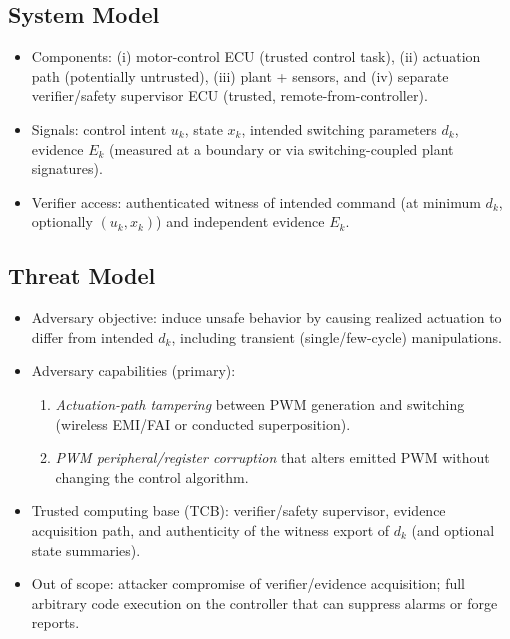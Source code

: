 \subsection{System Model}
\begin{itemize}
    \item Components: (i) motor-control ECU (trusted control task), (ii) actuation path (potentially untrusted), (iii) plant + sensors, and (iv) separate verifier/safety supervisor ECU (trusted, remote-from-controller).
    \item Signals: control intent $u_k$, state $x_k$, intended switching parameters $d_k$, evidence $E_k$ (measured at a boundary or via switching-coupled plant signatures).
    \item Verifier access: authenticated witness of intended command (at minimum $d_k$, optionally $(u_k,x_k)$) and independent evidence $E_k$.
\end{itemize}

\subsection{Threat Model}
\begin{itemize}
    \item Adversary objective: induce unsafe behavior by causing realized actuation to differ from intended $d_k$, including transient (single/few-cycle) manipulations.
    \item Adversary capabilities (primary):
    \begin{enumerate}
        \item \emph{Actuation-path tampering} between PWM generation and switching (wireless EMI/FAI or conducted superposition).
        \item \emph{PWM peripheral/register corruption} that alters emitted PWM without changing the control algorithm.
    \end{enumerate}
    \item Trusted computing base (TCB): verifier/safety supervisor, evidence acquisition path, and authenticity of the witness export of $d_k$ (and optional state summaries).
    \item Out of scope: attacker compromise of verifier/evidence acquisition; full arbitrary code execution on the controller that can suppress alarms or forge reports.
\end{itemize}